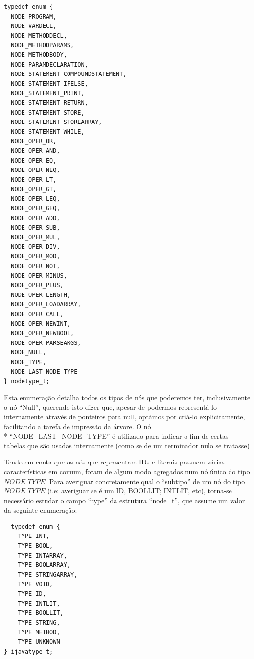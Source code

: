 \documentclass[11pt,a4paper]{article}
\begin{document}
\begin{lstlisting}
typedef enum {
  NODE_PROGRAM,
  NODE_VARDECL,
  NODE_METHODDECL, 
  NODE_METHODPARAMS,
  NODE_METHODBODY,
  NODE_PARAMDECLARATION,
  NODE_STATEMENT_COMPOUNDSTATEMENT,
  NODE_STATEMENT_IFELSE,
  NODE_STATEMENT_PRINT,
  NODE_STATEMENT_RETURN,
  NODE_STATEMENT_STORE,
  NODE_STATEMENT_STOREARRAY,
  NODE_STATEMENT_WHILE,
  NODE_OPER_OR,
  NODE_OPER_AND,
  NODE_OPER_EQ,
  NODE_OPER_NEQ,
  NODE_OPER_LT,
  NODE_OPER_GT,
  NODE_OPER_LEQ,
  NODE_OPER_GEQ,
  NODE_OPER_ADD,
  NODE_OPER_SUB,
  NODE_OPER_MUL,
  NODE_OPER_DIV,
  NODE_OPER_MOD,
  NODE_OPER_NOT,
  NODE_OPER_MINUS,
  NODE_OPER_PLUS,
  NODE_OPER_LENGTH,
  NODE_OPER_LOADARRAY,
  NODE_OPER_CALL,
  NODE_OPER_NEWINT,
  NODE_OPER_NEWBOOL,
  NODE_OPER_PARSEARGS,
  NODE_NULL,
  NODE_TYPE,
  NODE_LAST_NODE_TYPE
} nodetype_t;
\end{lstlisting}
Esta enumeração detalha todos os tipos de nós que poderemos ter, inclusivamente o nó ``Null'', querendo isto dizer que, apesar de podermos representá-lo internamente através de ponteiros para null, optámos por criá-lo explicitamente, facilitando a tarefa de impressão da árvore. O nó  \\* ``NODE\_LAST\_NODE\_TYPE'' é utilizado para indicar o fim de certas tabelas que são usadas internamente (como se de um terminador nulo se tratasse)

Tendo em conta que os nós que representam IDs e literais possuem várias características em comum, foram de algum modo agregados num nó único do tipo $NODE\_TYPE$. Para averiguar concretamente qual o ``subtipo'' de um nó do tipo $NODE\_TYPE$ (i.e: averiguar se é um ID, BOOLLIT; INTLIT, etc), torna-se necessário estudar o campo ``type'' da estrutura ``node\_t'', que assume um valor da seguinte enumeração:
\begin{lstlisting}
  typedef enum {
    TYPE_INT,
    TYPE_BOOL,
    TYPE_INTARRAY,
    TYPE_BOOLARRAY,
    TYPE_STRINGARRAY,
    TYPE_VOID,
    TYPE_ID,
    TYPE_INTLIT,
    TYPE_BOOLLIT,
    TYPE_STRING,
    TYPE_METHOD,
    TYPE_UNKNOWN
} ijavatype_t;

\end{lstlisting}
\end{document}
